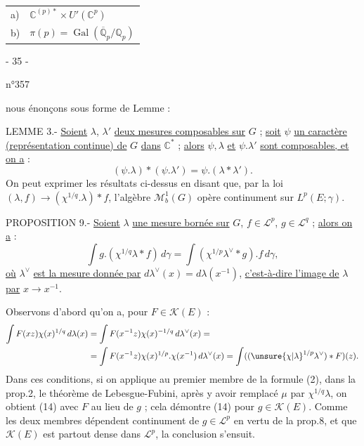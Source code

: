 \begin{tabular}{ll}
a)&$\mathbb C^{(p)*}\times U'(\mathbb C^p)$\\
b)&$\pi(p)=\operatorname{Gal}(\overline{\mathbb Q}_p/\mathbb Q_p)$
\end{tabular}
\begin{center}- 35 -\end{center}
\begin{flushright}n°357\end{flushright}
nous énonçons sous forme de Lemme :

LEMME 3.- \uline{Soient} $\lambda$, $\lambda'$ \uline{deux mesures composables sur} $G$ ; \uline{soit} $\psi$ \uline{un caractère (représentation continue) de} $G$ \uline{dans} $\mathbb C^*$ ; \uline{alors} $\psi,\lambda$ \uline{et} $\psi.\lambda'$ \uline{sont composables, et on a} :
\[
(\psi.\lambda)*(\psi.\lambda')=\psi.(\lambda*\lambda').
\]
On peut exprimer les résultats ci-dessus en disant que, par la loi $(\lambda,f)\to(\chi^{1/q}.\lambda)*f$, l'algèbre $\mathcal M_b^1(G)$ opère continument sur $L^p(E;\gamma)$.

PROPOSITION 9.- \uline{Soient} $\lambda$ \uline{une mesure bornée sur} $G$, $f\in\mathcal L^p$, $g\in\mathcal L^q$ ; \uline{alors on a} :
\[
\tag{14}
\int g.(\chi^{1/q}\lambda*f)\,d\gamma
=\int(\chi^{1/p}\lambda^\vee*g).f\,d\gamma,
\]
\uline{où} $\lambda^\vee$ \uline{est la mesure donnée par} $d\lambda^\vee(x)=d\lambda(x^{-1})$, \uline{c'est-à-dire l'image de} $\lambda$ \uline{par} $x\to x^{-1}$.

Observons d'abord qu'on a, pour $F\in\mathcal K(E)$ :
\[
\begin{aligned}
\int F(xz)\chi(x)^{1/q}\,d\lambda(x)
&=\int F(x^{-1}z)\chi(x)^{-1/q}\,d\lambda^\vee(x)=\\
&=\int F(x^{-1}z)\chi(x)^{1/p}.\chi(x^{-1})\,d\lambda^\vee(x)
=\int((\unsure{\chi|\lambda}^{1/p}\lambda^\vee)*F)(z).
\end{aligned}
\]
Dans ces conditions, si on applique au premier membre de la formule (2), dans la prop.2, le théorème de Lebesgue-Fubini, après y avoir remplacé $\mu$ par $\chi^{1/q}\lambda$, on obtient (14) avec $F$ au lieu de $g$ ; cela démontre (14) pour $g\in\mathcal K(E)$. Comme les deux membres dépendent continument de $g\in\mathcal L^p$ en vertu de la prop.8, et que $\mathcal K(E)$ est partout dense dans $\mathcal L^p$, la conclusion s'ensuit.

